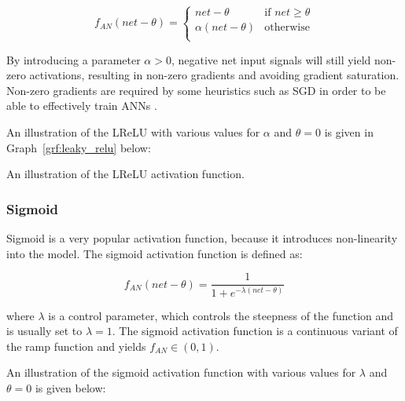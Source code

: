 \begin{equation}
    f_{AN}(net - \theta) = 
    \begin{cases}
        net - \theta & \text{if $net \geq \theta $}\\
        \alpha(net - \theta) & \text{otherwise}\\
    \end{cases}
    \label{eq:leaky_relu}
\end{equation}

\noindent
By introducing a parameter $\alpha >
0$, negative net input signals will still yield
non-zero activations, resulting in non-zero gradients and avoiding gradient
saturation. Non-zero gradients are required by some heuristics such as
\ac{SGD} in order to be able to effectively train \acp{ANN}
\cite{ref:hanin:2018}.

An illustration of the \ac{LReLU} with various values for $\alpha$ and $\theta =
0$ is given in Graph~\ref{grf:leaky_relu} below:

\begin{graph}[H]
    \centering
    
    \caption[The \ac{LReLU} activation function]{An illustration of the
    \acs{LReLU} activation function.}
    \label{grf:leaky_relu}
\end{graph}


\subsubsection{Sigmoid}
\label{sec:anns:an:act_functions:sigmoid}

Sigmoid is a very popular activation
function, because it introduces non-linearity into the model. The
sigmoid activation function is defined
as:
	
\begin{equation}
    f_{AN}(net - \theta) = \frac{1}{1+e^{-\lambda(net - \theta)}}
    \label{eq:sigmoid}
\end{equation}

\noindent where $\lambda$ is a control parameter, which controls the steepness
of the function and is usually set to $\lambda = 1$.  \noindent The
sigmoid activation function is a
continuous variant of the ramp function and yields $f_{AN} \in (0,1)$.

An illustration of the sigmoid activation function with various values for $\lambda$ and $\theta = 0$
is given below:

